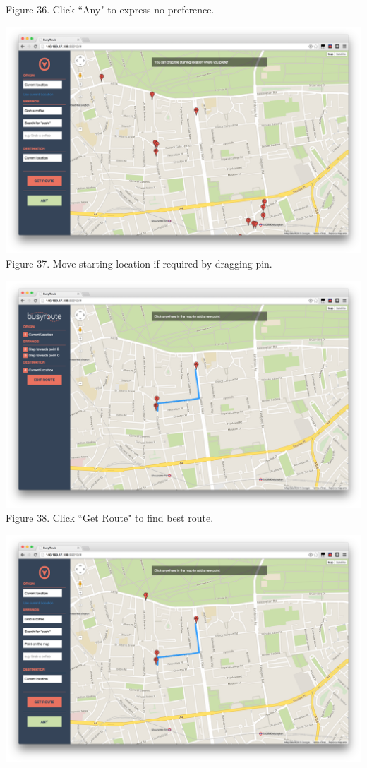 \documentclass[a4paper, 10pt]{report}
\begin{document}
\begin{appendices}
\begin{center}
Figure 36. Click ``Any" to express no preference.
\end{center}
\begin{center}
\includegraphics[scale=0.18]{um-10-move-starting.png}\\
Figure 37. Move starting location if required by dragging pin.
\end{center}
\begin{center}
\includegraphics[scale=0.18]{um-11-get-route.png}\\
Figure 38. Click ``Get Route" to find best route.
\end{center}
\begin{center}
\includegraphics[scale=0.18]{um-12-add-new-point.png}\\

\end{center}
\end{appendices}
\end{document}
